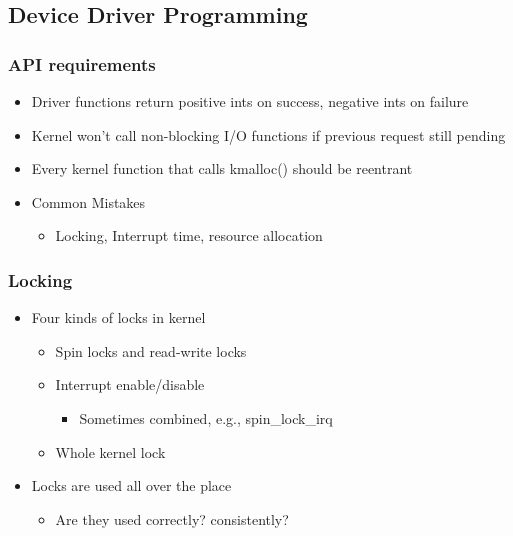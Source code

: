 \subsection{Device Driver Programming} %
\begin{frame}[fragile]
    \frametitle{API requirements}
    \begin{itemize}
        \item Driver functions return positive ints on success, negative ints on failure
        \item Kernel won’t call non-blocking I/O functions if previous request still pending
        \item Every kernel function that calls kmalloc() should be reentrant \pause
        \item Common Mistakes
        \begin{itemize}
            \item Locking, Interrupt time, resource allocation
        \end{itemize}
    \end{itemize}
\end{frame}
% 
% 
% 
% 
\begin{frame}[fragile]
    \frametitle{Locking}
    \begin{itemize}
        \item Four kinds of locks in kernel
        \begin{itemize}
            \item Spin locks and read-write locks
            \item Interrupt enable/disable
            \begin{itemize}
                \item Sometimes combined, e.g., spin\_lock\_irq
            \end{itemize}
            \item Whole kernel lock
        \end{itemize} \pause
        \item Locks are used all over the place
        \begin{itemize}
            \item Are they used correctly?  consistently?
        \end{itemize}
    \end{itemize}
\end{frame}
